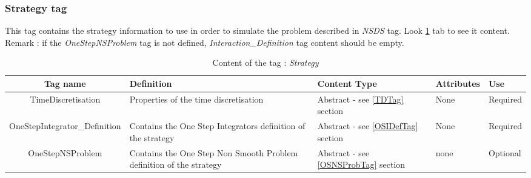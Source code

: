 \subsubsection{Strategy tag}
\label{StrategyTag}

This tag contains the strategy information to use in order to simulate the problem described in \textit{NSDS} tag. Look \ref{tab-Strategy} tab to see it content.\\
Remark : if the \textit{OneStepNSProblem} tag is not defined, \textit{Interaction\_Definition} tag content should be empty.


\begin{table}[!hbp]
\begin{center}
\begin{tabular}{|c|p{4cm}|p{2cm}|p{2.5cm}|p{1.8cm}|}
\hline
\bf{Tag name} & \bf{Definition} & \bf{Content Type} & \bf{Attributes} & \bf{Use}
\\\hline
\hline
TimeDiscretisation 	      & Properties of the time discretisation & Abstract - see \ref{TDTag} section  & None & Required \\
\hline
OneStepIntegrator\_Definition & Contains the One Step Integrators definition of the strategy & Abstract - see \ref{OSIDefTag} section & None & Required \\
\hline


OneStepNSProblem	      & Contains the One Step Non Smooth Problem definition of the strategy & Abstract - see \ref{OSNSProbTag} section  & none & Optional \\
\hline
\end{tabular}
\end{center}
\caption{Content of the tag : \textit{Strategy}}
\label{tab-Strategy}
\end{table}



